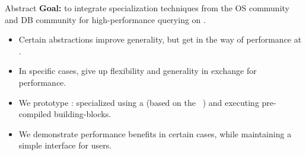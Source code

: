\begin{block}{Abstract}
  \textbf{Goal:} to integrate specialization techniques from the OS
    community  and DB community
     for high-performance querying on
    .

  \begin{itemize}

  \item Certain abstractions improve generality, but get in the way of
    performance at .

    
  \item In specific cases, give up flexibility and generality in exchange for performance.


  \item We prototype : specialized using a
     (based on the ~\cite{HALE:2015:NAUTILUS}) and executing
    pre-compiled building-blocks.


  \item We demonstrate performance benefits in certain cases, while
    maintaining a simple interface for users.

  \end{itemize}
\end{block}

